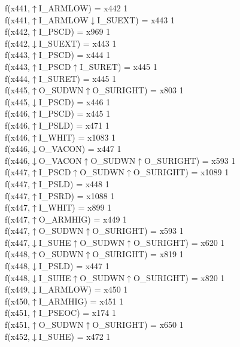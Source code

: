 f(x441,$\uparrow$I\_ARMLOW) = x442 {1} \\
f(x441,$\uparrow$I\_ARMLOW$\downarrow$I\_SUEXT) = x443 {1} \\
f(x442,$\uparrow$I\_PSCD) = x969 {1} \\
f(x442,$\downarrow$I\_SUEXT) = x443 {1} \\
f(x443,$\uparrow$I\_PSCD) = x444 {1} \\
f(x443,$\uparrow$I\_PSCD$\uparrow$I\_SURET) = x445 {1} \\
f(x444,$\uparrow$I\_SURET) = x445 {1} \\
f(x445,$\uparrow$O\_SUDWN$\uparrow$O\_SURIGHT) = x803 {1} \\
f(x445,$\downarrow$I\_PSCD) = x446 {1} \\
f(x446,$\uparrow$I\_PSCD) = x445 {1} \\
f(x446,$\uparrow$I\_PSLD) = x471 {1} \\
f(x446,$\uparrow$I\_WHIT) = x1083 {1} \\
f(x446,$\downarrow$O\_VACON) = x447 {1} \\
f(x446,$\downarrow$O\_VACON$\uparrow$O\_SUDWN$\uparrow$O\_SURIGHT) = x593 {1} \\
f(x447,$\uparrow$I\_PSCD$\uparrow$O\_SUDWN$\uparrow$O\_SURIGHT) = x1089 {1} \\
f(x447,$\uparrow$I\_PSLD) = x448 {1} \\
f(x447,$\uparrow$I\_PSRD) = x1088 {1} \\
f(x447,$\uparrow$I\_WHIT) = x899 {1} \\
f(x447,$\uparrow$O\_ARMHIG) = x449 {1} \\
f(x447,$\uparrow$O\_SUDWN$\uparrow$O\_SURIGHT) = x593 {1} \\
f(x447,$\downarrow$I\_SUHE$\uparrow$O\_SUDWN$\uparrow$O\_SURIGHT) = x620 {1} \\
f(x448,$\uparrow$O\_SUDWN$\uparrow$O\_SURIGHT) = x819 {1} \\
f(x448,$\downarrow$I\_PSLD) = x447 {1} \\
f(x448,$\downarrow$I\_SUHE$\uparrow$O\_SUDWN$\uparrow$O\_SURIGHT) = x820 {1} \\
f(x449,$\downarrow$I\_ARMLOW) = x450 {1} \\
f(x450,$\uparrow$I\_ARMHIG) = x451 {1} \\
f(x451,$\uparrow$I\_PSEOC) = x174 {1} \\
f(x451,$\uparrow$O\_SUDWN$\uparrow$O\_SURIGHT) = x650 {1} \\
f(x452,$\downarrow$I\_SUHE) = x472 {1} \\
